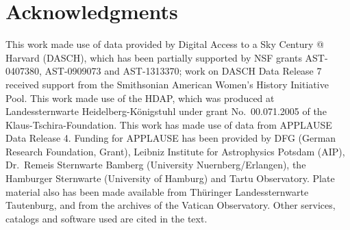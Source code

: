 \documentclass[11pt]{article}
\begin{document}
\section*{Acknowledgments}
This work made use of data provided by Digital Access to a Sky Century @ Harvard (DASCH), which has been partially supported by NSF grants AST-0407380, AST-0909073 and AST-1313370; work on DASCH Data Release 7 received support from the Smithsonian American Women's History Initiative Pool. This work made use of the HDAP, which was produced at Landessternwarte Heidelberg-Königstuhl under grant No.~00.071.2005 of the Klaus-Tschira-Foundation. This work has made use of data from APPLAUSE Data Release 4. Funding for APPLAUSE has been provided by DFG (German Research Foundation, Grant), Leibniz Institute for Astrophysics Potsdam (AIP), Dr.~Remeis Sternwarte Bamberg (University Nuernberg/Erlangen), the Hamburger Sternwarte (University of Hamburg) and Tartu Observatory. Plate material also has been made available from Thüringer Landessternwarte Tautenburg, and from the archives of the Vatican Observatory. Other services, catalogs and software used are cited in the text.
\end{document}
